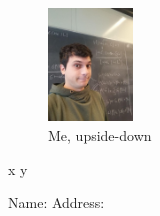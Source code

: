 \documentclass[10pt,a5paper]{article}
\begin{document}
\begin{figure}
\centering
\includegraphics[height=3cm,angle=260]{me.jpg}
\caption{Me, upside-down}
\end{figure}

\lipsum

x \hfill y

Name: \hrulefill \quad Address: \dotfill

{\color{red} \lipsum }
\end{document}
